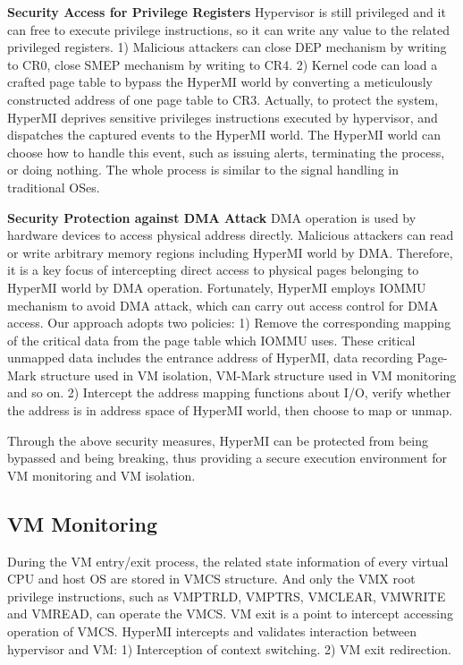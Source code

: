 \documentclass[conference]{IEEEtran}
\begin{document}
\textbf{Security Access for Privilege Registers}
Hypervisor is still privileged and it can free to execute privilege instructions, so it can write any value to the related privileged registers. 1) Malicious attackers can close DEP mechanism by writing to CR0, close SMEP mechanism by writing to CR4. 2) Kernel code can load a crafted page table to bypass the HyperMI world by converting a meticulously constructed address of one page table to CR3.
Actually, to protect the system, HyperMI deprives sensitive privileges instructions executed by hypervisor, and dispatches the captured events to the HyperMI world. The HyperMI world can choose how to handle this event, such as issuing alerts, terminating the process, or doing nothing. The whole process is similar to the signal handling in traditional OSes.

\textbf{Security Protection against DMA Attack}
DMA operation is used by hardware devices to access physical address directly. Malicious attackers can read or write arbitrary memory regions including HyperMI world by DMA. Therefore, it is a key focus of intercepting direct access to physical pages belonging to HyperMI world by DMA operation. 
Fortunately, HyperMI employs IOMMU mechanism to avoid DMA attack, which can carry out access control for DMA access. Our approach adopts two policies: 1) Remove the corresponding mapping of the critical data from the page table which IOMMU uses. These critical unmapped data includes the entrance address of HyperMI, data recording Page-Mark structure used in VM isolation, VM-Mark structure used in VM monitoring and so on. 2) Intercept the address mapping functions about I/O, verify whether the address is in address space of HyperMI world, then choose to map or unmap.


Through the above security measures, HyperMI can be protected from being bypassed and being breaking, thus providing a secure execution environment for VM monitoring and VM isolation.




\subsection{VM Monitoring}

During the VM entry/exit process, the related state information of every virtual CPU and host OS are stored in VMCS structure. 
And only the VMX root privilege instructions, such as VMPTRLD, VMPTRS, VMCLEAR, VMWRITE and VMREAD, can operate the VMCS.
VM exit is a point to intercept accessing operation of VMCS. HyperMI intercepts and validates interaction between hypervisor and VM: 1) Interception of context switching. 2) VM exit redirection.
\end{document}
